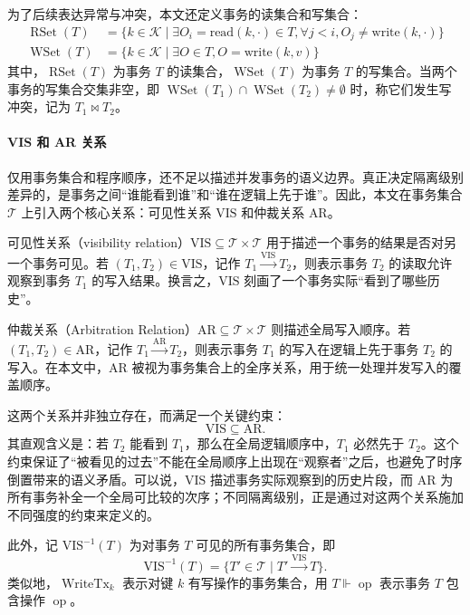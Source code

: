 为了后续表达异常与冲突，本文还定义事务的读集合和写集合：
\begin{equation}
    \begin{aligned}
        \operatorname{RSet}(T) & = \{ k \in \mathcal{K} \mid \exists O_i = \text{read}(k, \cdot) \in T, \forall j < i, O_j \neq \text{write}(k, \cdot) \} \\
        \operatorname{WSet}(T) & = \{ k \in \mathcal{K} \mid \exists O \in T, O = \text{write}(k, v) \}
    \end{aligned}
\end{equation}
其中，$\operatorname{RSet}(T)$ 为事务 $T$ 的读集合，$\operatorname{WSet}(T)$ 为事务 $T$ 的写集合。当两个事务的写集合交集非空，即 $\operatorname{WSet}(T_1) \cap \operatorname{WSet}(T_2) \neq \emptyset$ 时，称它们发生写冲突，记为 $T_1 \bowtie T_2$。

\paragraph*{VIS 和 AR 关系}
\label{sec:visandar}
仅用事务集合和程序顺序，还不足以描述并发事务的语义边界。真正决定隔离级别差异的，是事务之间“谁能看到谁”和“谁在逻辑上先于谁”。因此，本文在事务集合 $\mathcal{T}$ 上引入两个核心关系：可见性关系 $\text{VIS}$ 和仲裁关系 $\text{AR}$。

可见性关系（visibility relation）$\text{VIS} \subseteq \mathcal{T} \times \mathcal{T}$ 用于描述一个事务的结果是否对另一个事务可见。若 $(T_1, T_2) \in \text{VIS}$，记作 $T_1 \xrightarrow{\text{VIS}} T_2$，则表示事务 $T_2$ 的读取允许观察到事务 $T_1$ 的写入结果。换言之，$\text{VIS}$ 刻画了一个事务实际“看到了哪些历史”。

仲裁关系（Arbitration Relation）$\text{AR} \subseteq \mathcal{T} \times \mathcal{T}$ 则描述全局写入顺序。若 $(T_1, T_2) \in \text{AR}$，记作 $T_1 \xrightarrow{\text{AR}} T_2$，则表示事务 $T_1$ 的写入在逻辑上先于事务 $T_2$ 的写入。在本文中，$\text{AR}$ 被视为事务集合上的全序关系，用于统一处理并发写入的覆盖顺序。

这两个关系并非独立存在，而满足一个关键约束：
\[
    \text{VIS} \subseteq \text{AR}.
\]
其直观含义是：若 $T_2$ 能看到 $T_1$，那么在全局逻辑顺序中，$T_1$ 必然先于 $T_2$。这个约束保证了“被看见的过去”不能在全局顺序上出现在“观察者”之后，也避免了时序倒置带来的语义矛盾。可以说，$\text{VIS}$ 描述事务实际观察到的历史片段，而 $\text{AR}$ 为所有事务补全一个全局可比较的次序；不同隔离级别，正是通过对这两个关系施加不同强度的约束来定义的。

此外，记 $\operatorname{VIS^{-1}}(T)$ 为对事务 $T$ 可见的所有事务集合，即
\[
    \operatorname{VIS^{-1}}(T) = \{ T' \in \mathcal{T} \mid T' \xrightarrow{\text{VIS}} T \}.
\]
类似地，$\operatorname{WriteTx}_k$ 表示对键 $k$ 有写操作的事务集合，用 $T \Vdash \operatorname{op}$ 表示事务 $T$ 包含操作 $\operatorname{op}$。

